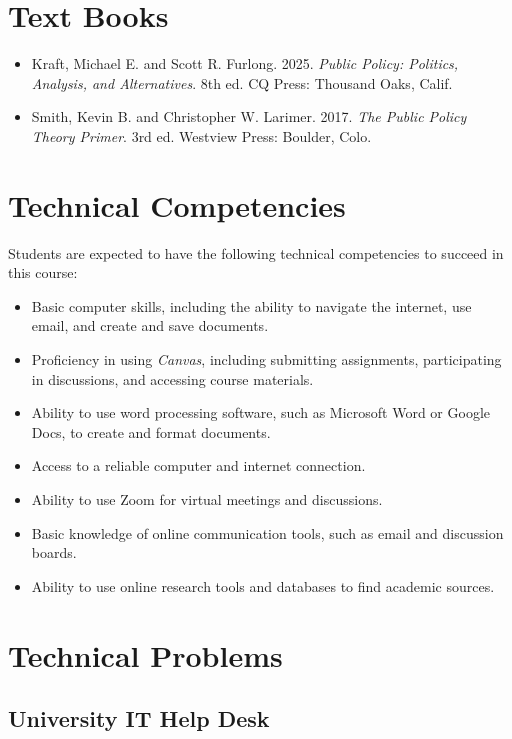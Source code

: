 \documentclass[12pt, letterpaper]{article}
\begin{document}
\section{Text Books}

\begin{itemize}
\item Kraft, Michael E. and Scott R. Furlong. 2025. \emph{Public Policy: Politics, Analysis, and Alternatives}. 8th ed. CQ Press: Thousand Oaks, Calif.

\item Smith, Kevin B. and Christopher W. Larimer. 2017. \emph{The Public Policy Theory Primer}. 3rd ed. Westview Press: Boulder, Colo.
\end{itemize}
\section{Technical Competencies}

Students are expected to have the following technical competencies to succeed in this course:
\begin{itemize}
    \item Basic computer skills, including the ability to navigate the internet, use email, and create and save documents.
    \item Proficiency in using \emph{Canvas}, including submitting assignments, participating in discussions, and accessing course materials.
    \item Ability to use word processing software, such as Microsoft Word or Google Docs, to create and format documents.
    \item Access to a reliable computer and internet connection.
    \item Ability to use Zoom for virtual meetings and discussions.
    \item Basic knowledge of online communication tools, such as email and discussion boards.
    \item Ability to use online research tools and databases to find academic sources.
\end{itemize}

\section{Technical Problems}

\subsection*{University IT Help Desk}
\end{document}
